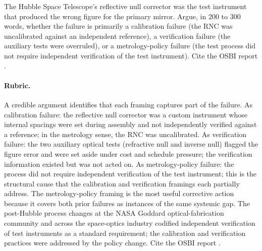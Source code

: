 \begin{exercise}
The Hubble Space Telescope's reflective null corrector was the test
instrument that produced the wrong figure for the primary mirror.
Argue, in 200 to 300 words, whether the failure is primarily a
calibration failure (the RNC was uncalibrated against an
independent reference), a verification failure (the auxiliary
tests were overruled), or a metrology-policy failure (the test
process did not require independent verification of the test
instrument). Cite the OSBI report \cite{acc:nasa-hubble-optical-systems-1990}.

\paragraph{Rubric.} A credible argument identifies that each framing
captures part of the failure. As calibration failure: the
reflective null corrector was a custom instrument whose internal
spacings were set during assembly and not independently verified
against a reference; in the metrology sense, the RNC was
uncalibrated. As verification failure: the two auxiliary optical
tests (refractive null and inverse null) flagged the figure error
and were set aside under cost and schedule pressure; the
verification information existed but was not acted on. As
metrology-policy failure: the process did not require independent
verification of the test instrument; this is the structural cause
that the calibration and verification framings each partially
address. The metrology-policy framing is the most useful corrective
action because it covers both prior failures as instances of the
same systemic gap. The post-Hubble process changes at the NASA
Goddard optical-fabrication community and across the space-optics
industry codified independent verification of test instruments as
a standard requirement; the calibration and verification practices
were addressed by the policy change. Cite the OSBI report
\cite{acc:nasa-hubble-optical-systems-1990}.
\end{exercise}

